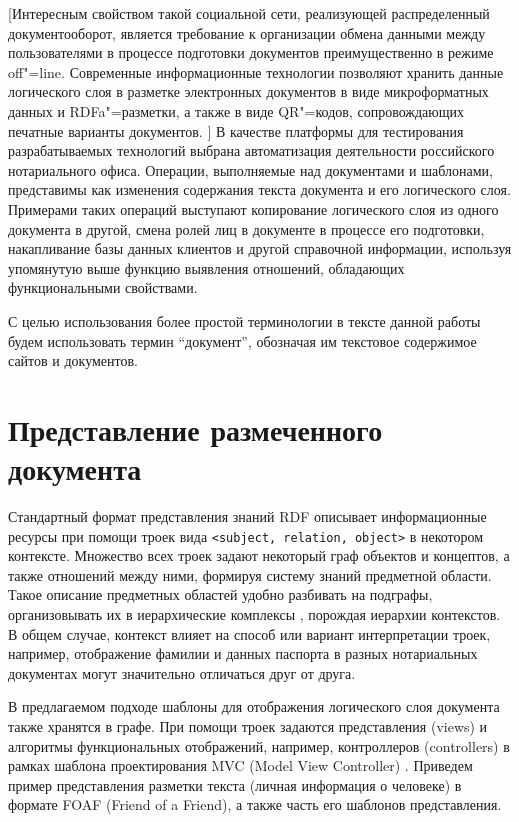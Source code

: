 \documentclass[utf8]{../IncArticle}
\newcommand{\e}[2][fcolor]{\textcolor{pcolor}{[}\textcolor{#1}{#2}\textcolor{pcolor}{]}}
\begin{document}
\e{Интересным свойством такой социальной сети, реализующей
распределенный документооборот, является требование к организации
обмена данными между пользователями в процессе подготовки документов
преимущественно в режиме off"=line.  Современные информационные
технологии позволяют хранить данные логического слоя в разметке
электронных документов в виде микроформатных данных и RDFa"=разметки,
а также в виде QR"=кодов, сопровождающих печатные варианты документов.
}
В качестве платформы для тестирования разрабатываемых технологий
выбрана автоматизация деятельности российского нотариального
офиса.  Операции, выполняемые над документами и шаблонами, представимы
как изменения содержания текста документа и его логического
слоя.  Примерами таких операций выступают копирование логического слоя
из одного документа в другой, смена ролей лиц в документе в процессе
его подготовки, накапливание базы данных клиентов и другой справочной
информации, используя упомянутую выше функцию выявления отношений,
обладающих функциональными свойствами.

С целью использования более простой терминологии в тексте данной
работы будем использовать термин ``документ'', обозначая им текстовое
содержимое сайтов и документов.

\section{Представление размеченного документа}

Стандартный формат представления знаний RDF описывает информационные
ресурсы при помощи троек вида \texttt{<subject, relation, object>} в
некотором контексте.  Множество всех троек задают некоторый граф
объектов и концептов, а также отношений между ними, формируя
систему знаний предметной области.  Такое описание предметных областей
удобно разбивать на подграфы, организовывать их в иерархические
комплексы \cite{b2:15}, порождая иерархии контекстов.  В общем случае,
контекст влияет на способ или вариант интерпретации троек, например,
отображение фамилии и данных паспорта в разных нотариальных документах
могут значительно отличаться друг от друга.

В предлагаемом подходе \cite{zont2013} шаблоны для отображения
логического слоя документа также хранятся в графе.  При помощи троек
задаются представления (views) и алгоритмы функциональных
отображений, например, контроллеров (controllers) в рамках шаблона
проектирования MVC (Model View Controller) \cite{b2:5}.  Приведем
пример представления разметки текста (личная информация о человеке) в
формате FOAF (Friend of a Friend), а также часть его шаблонов
представления.
\end{document}
